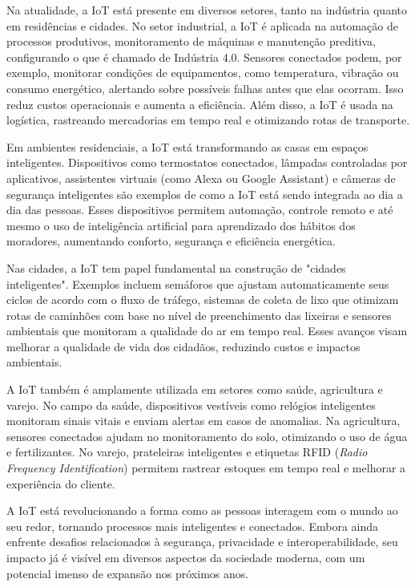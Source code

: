Na atualidade, a IoT está presente em diversos setores, tanto na indústria quanto em residências e cidades. No setor industrial, a IoT é aplicada na automação de processos produtivos, monitoramento de máquinas e manutenção preditiva, configurando o que é chamado de Indústria 4.0. Sensores conectados podem, por exemplo, monitorar condições de equipamentos, como temperatura, vibração ou consumo energético, alertando sobre possíveis falhas antes que elas ocorram. Isso reduz custos operacionais e aumenta a eficiência. Além disso, a IoT é usada na logística, rastreando mercadorias em tempo real e otimizando rotas de transporte.

Em ambientes residenciais, a IoT está transformando as casas em espaços inteligentes. Dispositivos como termostatos conectados, lâmpadas controladas por aplicativos, assistentes virtuais (como Alexa ou Google Assistant) e câmeras de segurança inteligentes são exemplos de como a IoT está sendo integrada ao dia a dia das pessoas. Esses dispositivos permitem automação, controle remoto e até mesmo o uso de inteligência artificial para aprendizado dos hábitos dos moradores, aumentando conforto, segurança e eficiência energética.

Nas cidades, a IoT tem papel fundamental na construção de "cidades inteligentes". Exemplos incluem semáforos que ajustam automaticamente seus ciclos de acordo com o fluxo de tráfego, sistemas de coleta de lixo que otimizam rotas de caminhões com base no nível de preenchimento das lixeiras e sensores ambientais que monitoram a qualidade do ar em tempo real. Esses avanços visam melhorar a qualidade de vida dos cidadãos, reduzindo custos e impactos ambientais.

A IoT também é amplamente utilizada em setores como saúde, agricultura e varejo. No campo da saúde, dispositivos vestíveis como relógios inteligentes monitoram sinais vitais e enviam alertas em casos de anomalias. Na agricultura, sensores conectados ajudam no monitoramento do solo, otimizando o uso de água e fertilizantes. No varejo, prateleiras inteligentes e etiquetas RFID (\textit{Radio Frequency Identification}) permitem rastrear estoques em tempo real e melhorar a experiência do cliente.

A IoT está revolucionando a forma como as pessoas interagem com o mundo ao seu redor, tornando processos mais inteligentes e conectados. Embora ainda enfrente desafios relacionados à segurança, privacidade e interoperabilidade, seu impacto já é visível em diversos aspectos da sociedade moderna, com um potencial imenso de expansão nos próximos anos.




